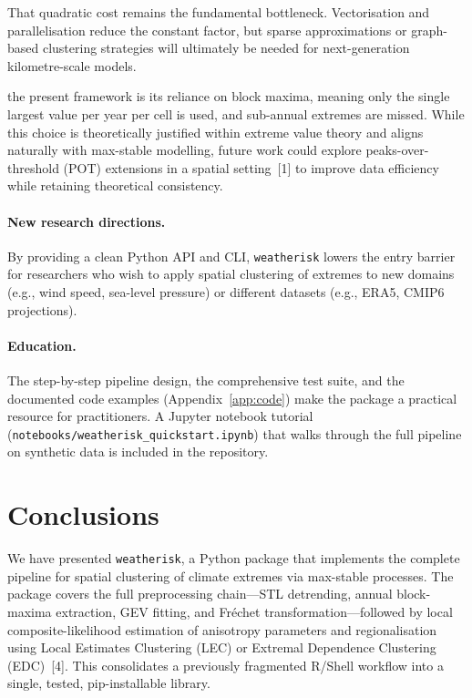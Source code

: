 \documentclass[preprint,12pt,a4paper]{elsarticle}
\newcommand{\revg}[1]{{\color{RevisionGreen}#1}}
\newcommand{\revo}[1]{{\color{RevisionOrange}#1}}
\newcommand{\revr}[1]{{\color{RevisionRed}#1}}
\begin{document}
\revg{That quadratic cost remains the fundamental bottleneck. Vectorisation and parallelisation reduce the constant factor, but sparse approximations or graph-based clustering strategies will ultimately be needed for next-generation kilometre-scale models.}

\revg{\revo{One methodological limitation of} the present framework is
its reliance on block maxima\revr{, meaning only the single largest value per year per cell is used, and sub-annual extremes are missed}.
While this choice is theoretically justified within extreme value
theory and aligns naturally with max-stable modelling, future work
could explore peaks-over-threshold (POT) extensions in a spatial
setting~[1] to improve data efficiency while retaining theoretical
consistency.}

\paragraph{New research directions.}
By providing a clean Python API and CLI, \texttt{weatherisk} lowers
the entry barrier for researchers who wish to apply spatial
clustering of extremes to new domains (e.g., wind speed, sea-level
pressure) or different datasets (e.g., ERA5, CMIP6 projections).

\paragraph{Education.}
The step-by-step pipeline design, the comprehensive test suite,
and the documented code examples (Appendix~\ref{app:code}) make
the package a practical resource for practitioners.  A Jupyter
notebook tutorial (\texttt{notebooks/weatherisk\_quickstart.ipynb})
that walks through the full pipeline on synthetic data is included
in the repository.

\section{Conclusions}
\label{sec:conclusions}

\revo{We have presented \texttt{weatherisk}, a Python package that
implements the complete pipeline for spatial clustering of climate
extremes via max-stable processes. The package covers the full
preprocessing chain---STL detrending, annual block-maxima extraction,
GEV fitting, and Fr\'{e}chet transformation---followed by local
composite-likelihood estimation of anisotropy parameters and
regionalisation using Local Estimates Clustering (LEC) or Extremal
Dependence Clustering (EDC)~[4]. This consolidates a previously
fragmented R/Shell workflow into a single, tested, pip-installable
library.}
\end{document}
